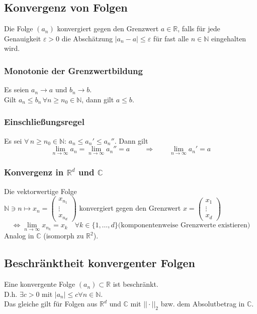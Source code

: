 \documentclass[10pt,a4paper^, twocolumn]{article}
\renewcommand{\epsilon}{\varepsilon} %
\begin{document}
\subsection{Konvergenz von Folgen}
	Die Folge $(a_n)$ konvergiert gegen den Grenzwert $a \in \mathbb{R}$, falls für
	jede Genauigkeit $\epsilon > 0$ die Abschätzung $|a_n - a| \leq \epsilon$ für fast
	alle $n \in \mathbb{N}$ eingehalten wird.
\subsubsection{Monotonie der Grenzwertbildung}
	Es seien $a_n \to a$ und $b_n \to b$.\\
	Gilt $a_n \leq b_n \, \forall n \geq n_0 \in \mathbb{N}$, dann gilt $ a \leq b$.
\subsubsection{Einschließungsregel}
	Es sei $\forall \, n \geq n_0 \in \mathbb{N} : \, a_n \leq a_n' \leq a_n''$.
	Dann gilt 
	$$\lim_{n \to \infty} a_n = \lim_{n \to \infty} a_n'' = a 
	\qquad \Rightarrow  \qquad \lim_{n \to \infty} a_n' = a$$
\subsubsection{Konvergenz in $\mathbb{R}^d$ und $\mathbb{C}$}
	Die vektorwertige Folge\\
	$\mathbb{N} \ni n \mapsto x_n = 
		\begin{pmatrix}
			x_{n_1}\\
			\vdots \\
			x_{n_d}
		\end{pmatrix}$
	konvergiert gegen den Grenzwert $
		x = \begin{pmatrix}
			x_{1}\\
			\vdots \\
			x_{d}
		\end{pmatrix}$\\
	$$\Leftrightarrow 
		\lim_{n \to \infty} x_{n_k} = x_k 
		\quad \forall k \in \{1, \dots, d \} 
		\text{(komponentenweise Grenzwerte existieren)}$$
	Analog in $\mathbb{C}$ (isomorph zu $\mathbb{R}^2$).
\subsection{Beschränktheit konvergenter Folgen}
	Eine konvergente Folge $(a_n) \subset \mathbb{R}$ ist beschränkt.\\
	D.h. $\exists c > 0 $ mit $|a_n| \leq c \forall n \in \mathbb{N}$.\\
	Das gleiche gilt für Folgen aus  $\mathbb{R}^d$ und $\mathbb{C}$ mit $||\cdot||_2$
	bzw. dem Absolutbetrag in $\mathbb{C}$.
\end{document}
